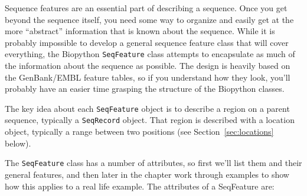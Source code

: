 \documentclass{report}
\begin{document}
Sequence features are an essential part of describing a sequence. Once you get beyond the sequence itself, you need some way to organize and easily get at the more ``abstract'' information that is known about the sequence. While it is probably impossible to develop a general sequence feature class that will cover everything, the Biopython \verb|SeqFeature| class attempts to encapsulate as much of the information about the sequence as possible. The design is heavily based on the GenBank/EMBL feature tables, so if you understand how they look, you'll probably have an easier time grasping the structure of the Biopython classes.

The key idea about each \verb|SeqFeature| object is to describe a region on a parent sequence, typically a \verb|SeqRecord| object. That region is described with a location object, typically a range between two positions (see Section~\ref{sec:locations} below).

The \verb|SeqFeature| class has a number of attributes, so first we'll list them and their general features, and then later in the chapter work through examples to show how this applies to a real life example. The attributes of a SeqFeature are:
\end{document}
